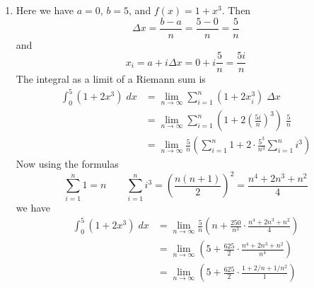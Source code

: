\documentclass{article}
\newcommand{\ds}{\displaystyle}
\begin{document}
\begin{enumerate}
\begin{enumerate}
\begin{align*}
        \frac{n(n+1)}{2} + \frac{9}{n^2} \cdot \frac{n(n+1)(2n+1)}{6}
        \right)
      \\
      &= \lim_{n\to\infty} \left( -6 + \frac{36}{2}\cdot \frac{n^2+n}{n^2} +
        \frac{27}{6} \cdot \frac{2n^3+3n^2+n}{n^3} \right)
      \\
      &= \lim_{n\to\infty} -6 + \lim_{n\to\infty} 18 \cdot \frac{1+1/n}{1} +
        \lim_{n\to\infty} \frac{9}{2} \cdot \frac{2 + 3/n + 1/n^2}{1}
      \\
      &= -6 + 18 \cdot \frac{1+0}{1} + \frac{9}{2} \cdot \frac{2+0+0}{1}
      \\
      &= -6 + 18 + 9 = 21
    \end{align*}
  \item %
    Here we have $a=0$, $b=5$, and $f(x)=1+x^3$.  Then
    \begin{equation*}
      \Delta x = \frac{b-a}{n} = \frac{5-0}{n} = \frac{5}{n}
    \end{equation*}
    and
    \begin{equation*}
      x_i = a + i \Delta x = 0 + i \frac{5}{n} = \frac{5i}{n}
    \end{equation*}
    The integral as a limit of a Riemann sum is
    \begin{align*}
      \int_0^5 (1+2x^3) \; dx
      &= \lim_{n\to\infty} \sum_{i=1}^n (1+2x_i^3) \; \Delta x
      \\
      &= \lim_{n\to\infty} \sum_{i=1}^n \left(1 +
        2\left(\frac{5i}{n}\right)^3\right) \; \frac{5}{n}
      \\
      &= \lim_{n\to\infty} \frac{5}{n} \left(\sum_{i=1}^n 1 + 2 \cdot
        \frac{5^3}{n^3} \sum_{i=1}^n i^3 \right) 
    \end{align*}
    Now using the formulas
    \begin{equation*}
      \sum_{i=1}^n 1 = n \qquad \sum_{i=1}^n i^3 =
      \left(\frac{n(n+1)}{2}\right)^2 = \frac{n^4 + 2n^3 + n^2}{4}
    \end{equation*}
    we have
    \begin{align*}
      \int_0^5 (1+2x^3) \; dx
      &= \lim_{n\to\infty} \frac{5}{n} \left( n + \frac{250}{n^3}
        \cdot \frac{n^4+2n^3+n^2}{4} \right)
      \\
      &= \lim_{n\to\infty} \left(5 + \frac{625}{2}
        \cdot \frac{n^4+2n^3+n^2}{n^4}\right) 
      \\
      &= \lim_{n\to\infty} \left(5 + \frac{625}{2}
        \cdot \frac{1+2/n+1/n^2}{1}\right)
      \\

\end{align*}
\end{enumerate}
\end{enumerate}
\end{document}
